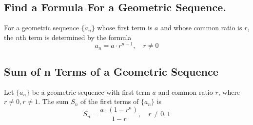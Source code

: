 \documentclass{report}
\begin{document}
   \subsection{Find a Formula For a Geometric Sequence.}
   \bigbreak \noindent 
   \smallbreak \noindent
   \begin{definition}
       For a geometric sequence $\{a_n\}$ whose first term is $a$ and whose common ratio is $r$, the $n$th term is determined by the formula
        \[ a_n = a \cdot r^{n-1}, \quad r \neq 0 \]
   \end{definition}
   \bigbreak \noindent 

   \bigbreak \noindent \bigbreak \noindent 
   \subsection{Sum of n Terms of a Geometric Sequence}
   \bigbreak \noindent 
   \smallbreak \noindent
   \begin{definition}
      Let $\{a_n\}$ be a geometric sequence with first term $a$ and common ratio $r$, where $r \neq 0, r \neq 1$. The sum $S_n$ of the first terms of $\{a_n\}$ is
    \[ S_n = \frac{a \cdot (1 - r^n)}{1 - r}, \quad r \neq 0, 1 \]
   \end{definition}
\end{document}
